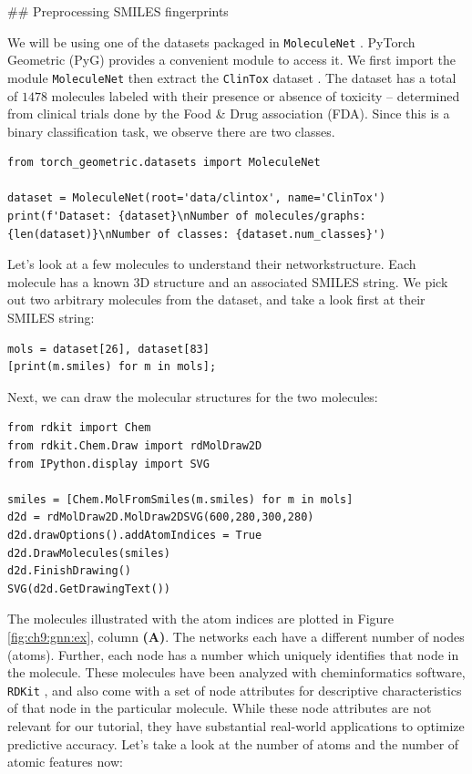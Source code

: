 ## Preprocessing SMILES fingerprints

We will be using one of the datasets packaged in \texttt{MoleculeNet} \cite{moleculenet}. PyTorch Geometric (PyG) \cite{pytorchgeom,pytorch} provides a convenient module to access it. We first import the module \texttt{MoleculeNet} then extract the \texttt{ClinTox} dataset \cite{Novick2013Nov}. The dataset has a total of $1478$ molecules labeled with their presence or absence of toxicity -- determined from clinical trials done by the Food & Drug association (FDA). Since this is a binary classification task, we observe there are two classes.

\begin{lstlisting}[style=python]
from torch_geometric.datasets import MoleculeNet

dataset = MoleculeNet(root='data/clintox', name='ClinTox')
print(f'Dataset: {dataset}\nNumber of molecules/graphs: {len(dataset)}\nNumber of classes: {dataset.num_classes}')
\end{lstlisting}

Let's look at a few molecules to understand their networkstructure. Each molecule has a known 3D structure and an associated SMILES string. We pick out two arbitrary molecules from the dataset, and take a look first at their SMILES string:

\begin{lstlisting}[style=python]
mols = dataset[26], dataset[83]
[print(m.smiles) for m in mols];
\end{lstlisting}

Next, we can draw the molecular structures for the two molecules:

\begin{lstlisting}[style=python]
from rdkit import Chem
from rdkit.Chem.Draw import rdMolDraw2D
from IPython.display import SVG

smiles = [Chem.MolFromSmiles(m.smiles) for m in mols]
d2d = rdMolDraw2D.MolDraw2DSVG(600,280,300,280)
d2d.drawOptions().addAtomIndices = True
d2d.DrawMolecules(smiles)
d2d.FinishDrawing()
SVG(d2d.GetDrawingText())
\end{lstlisting}

The molecules illustrated with the atom indices are plotted in Figure \ref{fig:ch9:gnn:ex}, column \textbf{(A)}. The networks each have a different number of nodes (atoms). Further, each node has a number which uniquely identifies that node in the molecule. These molecules have been analyzed with cheminformatics software, \texttt{RDKit} \cite{rdkit}, and also come with a set of node attributes for descriptive characteristics of that node in the particular molecule. While these node attributes are not relevant for our tutorial, they have substantial real-world applications to optimize predictive accuracy. Let's take a look at the number of atoms and the number of atomic features now:

